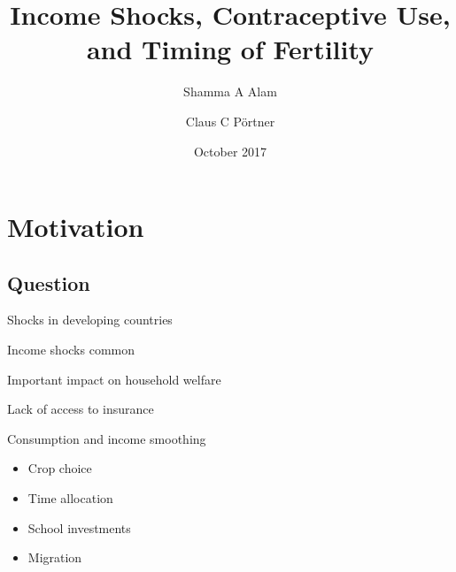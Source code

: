 \documentclass[red]{beamer}
\title[Income Shocks and Fertility]{Income Shocks, Contraceptive Use,\\ and Timing of Fertility}
\author[Alam and P\"ortner]{Shamma A Alam
\and
Claus C P\"ortner
}
\institute{}
\date{October 2017}
\begin{document}
\graphicspath{{../figures/}}

\def\sym#1{\ifmmode^{#1}\else\(^{#1}\)\fi}



\begin{frame}
    \titlepage
\end{frame}




\section{Motivation}

\subsection{Question}

\begin{frame}{Shocks in developing countries}

Income shocks common

\bigskip

Important impact on household welfare

\bigskip

Lack of access to insurance

\bigskip

Consumption and income smoothing
\begin{itemize}
\item Crop choice
\item Time allocation
\item School investments
\item Migration
\end{itemize}

\end{frame}
\end{document}
